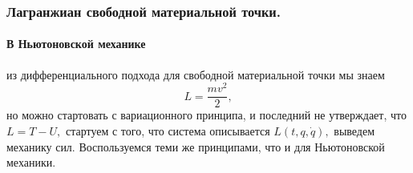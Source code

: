 \subsubsection{Лагранжиан свободной материальной точки.}
\paragraph{В Ньютоновской механике}\! из дифференциального подхода для свободной материальной точки мы знаем
\begin{equation}
L = \frac{mv^2}{2},
\end{equation}
но можно стартовать с вариационного принципа, и последний не утверждает, что $L = T -U,$ стартуем с того, что система описывается $L(t, q, \dot{q}),$ выведем механику сил.
Воспользуемся теми же принципами, что и для Ньютоновской механики.
